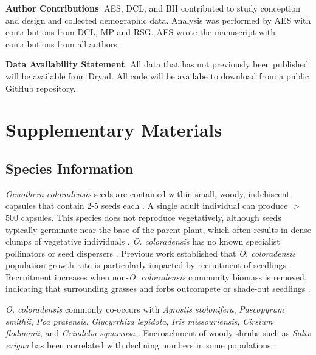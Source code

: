 \documentclass[12pt, letterpaper]{article}
\renewcommand{\thesection}{} %
\begin{document}
\small{
\textbf{Author Contributions}: AES, DCL, and BH contributed to study conception and design and collected demographic data. Analysis was performed by AES with contributions from DCL, MP and RSG. AES wrote the manuscript with contributions from all authors. 
} 

\small{\textbf{Data Availability Statement}: All data that has not previously been published will be available from Dryad. All code will be availabe to download from a public GitHub repository.}



\newpage

\setcounter{figure}{0}
\setcounter{table}{0}
\setcounter{section}{0}
\setcounter{page}{1}

\renewcommand{\thepage}{S\arabic{page}}
\renewcommand{\thesection}{S\arabic{section}}
\renewcommand{\thetable}{S\arabic{table}}
\renewcommand{\thefigure}{S\arabic{figure}}

\section{Supplementary Materials}
\normalfont
\subsection{Species Information}
\textit{Oenothera coloradensis} seeds are contained within small, woody, indehiscent capsules that contain 2-5 seeds each \cite{Burgess2005CapsuleColoradensis}. A single adult individual can produce $>$500 capsules. This species does not reproduce vegetatively, although seeds typically germinate near the base of the parent plant, which often results in dense clumps of vegetative individuals \cite{Heidel202133-YearWyoming}. \textit{O. coloradensis} has no known specialist pollinators or seed dispersers \cite{Floyd1998, Heidel202133-YearWyoming}. Previous work established that \textit{O. coloradensis} population growth rate is particularly impacted by recruitment of seedlings \cite{Floyd1998}. Recruitment increases when non-\textit{O. coloradensis} community biomass is removed, indicating that surrounding grasses and forbs outcompete or shade-out seedlings \cite{Munk2002RosetteSpecies}.

\textit{O. coloradensis} commonly co-occurs with \textit{Agrostis stolonifera}, \textit{Pascopyrum smithii}, \textit{Poa pratensis}, \textit{Glycyrrhiza lepidota}, \textit{Iris missouriensis}, \textit{Cirsium flodmanii}, and \textit{Grindelia squarrosa} \cite{Jennings2000EndangeredNebraska, Munk2002RosetteSpecies}. Encroachment of woody shrubs such as \textit{Salix exigua} has been correlated with declining numbers in some populations \cite{Heidel202133-YearWyoming}.
\end{document}
